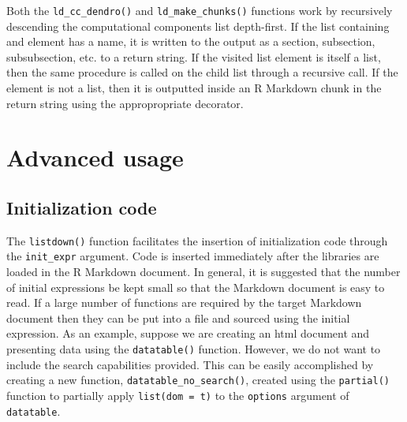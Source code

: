 \documentclass[
]{jss}
\begin{document}
Both the \texttt{ld\_cc\_dendro()} and \texttt{ld\_make\_chunks()}
functions work by recursively descending the computational components
list depth-first. If the list containing and element has a name, it is
written to the output as a section, subsection, subsubsection, etc. to a
return string. If the visited list element is itself a list, then the
same procedure is called on the child list through a recursive call. If
the element is not a list, then it is outputted inside an R Markdown
chunk in the return string using the appropropriate decorator.

\hypertarget{advanced-usage}{%
\section{Advanced usage}\label{advanced-usage}}

\hypertarget{initialization-code}{%
\subsection{Initialization code}\label{initialization-code}}

The \texttt{listdown()} function facilitates the insertion of
initialization code through the \texttt{init\_expr} argument. Code is
inserted immediately after the libraries are loaded in the R Markdown
document. In general, it is suggested that the number of initial
expressions be kept small so that the  Markdown document is
easy to read. If a large number of functions are required by the target
 Markdown document then they can be put into a file and
sourced using the initial expression. As an example, suppose we are
creating an html document and presenting data using the
\texttt{datatable()} function. However, we do not want to include the
search capabilities provided. This can be easily accomplished by
creating a new function, \texttt{datatable\_no\_search()}, created using
the \texttt{partial()} function \cite{purrr} to partially apply
\texttt{list(dom\ =\ \textquotesingle{}t\textquotesingle{})} to the
\texttt{options} argument of \texttt{datatable}.
\end{document}
